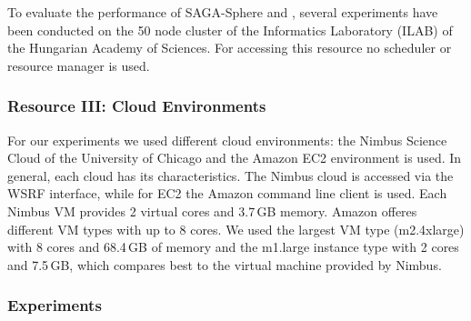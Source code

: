 \documentclass[3p,twocolumn]{elsarticle}
\begin{document}
To evaluate the performance of SAGA-Sphere and \sagamapreduce, several
experiments have been conducted on the 50 node cluster of the Informatics
Laboratory (ILAB) of the Hungarian Academy of Sciences. For accessing this
resource no scheduler or resource manager is used.


\subsubsection*{Resource III: Cloud Environments}

For our experiments we used different cloud environments: the Nimbus
Science Cloud of the University of Chicago and the Amazon EC2
environment is used. In general, each cloud has its
characteristics. The Nimbus cloud is accessed via the WSRF interface,
while for EC2 the Amazon command line client is used. Each Nimbus VM
provides 2 virtual cores and 3.7\,GB memory.  Amazon offeres different
VM types with up to 8 cores. We used the largest VM type (m2.4xlarge)
with 8 cores and 68.4\,GB of memory and the m1.large instance type
with 2 cores and 7.5\,GB, which compares best to the virtual machine
provided by Nimbus.


\subsubsection{Experiments} 
\end{document}
